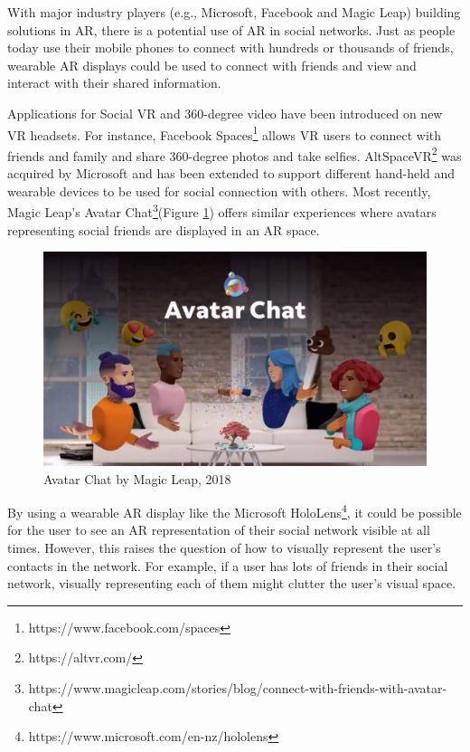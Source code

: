 
With major industry players (e.g., Microsoft, Facebook and Magic Leap) building solutions in AR, there is a potential use of AR in social networks. Just as people today use their mobile phones to connect with hundreds or thousands of friends, wearable AR displays could be used to connect with friends and view and interact with their shared information.

Applications for Social VR and 360-degree video have been introduced on new VR headsets. For instance, Facebook Spaces\footnote{https://www.facebook.com/spaces} allows VR users to connect with friends and family and share 360-degree photos and take selfies. AltSpaceVR\footnote{https://altvr.com/} was acquired by Microsoft and has been extended to support different hand-held and wearable devices to be used for social connection with others. Most recently, Magic Leap's Avatar Chat\footnote{https://www.magicleap.com/stories/blog/connect-with-friends-with-avatar-chat}(Figure \ref{fig:ml-avatar-chat}) offers similar experiences where avatars representing social friends are displayed in an AR space. 

\begin{figure}
    \centering
    \includegraphics[width=0.8\linewidth]{images/magic-leap-avatar-chat.jpg}
    \caption{Avatar Chat by Magic Leap, 2018}
    \label{fig:ml-avatar-chat}
\end{figure}

By using a wearable AR display like the Microsoft HoloLens\footnote{https://www.microsoft.com/en-nz/hololens}, it could be possible for the user to see an AR representation of their social network visible at all times. However, this raises the question of how to visually represent the user's contacts in the network. For example, if a user has lots of friends in their social network, visually representing each of them might clutter the user's visual space.

